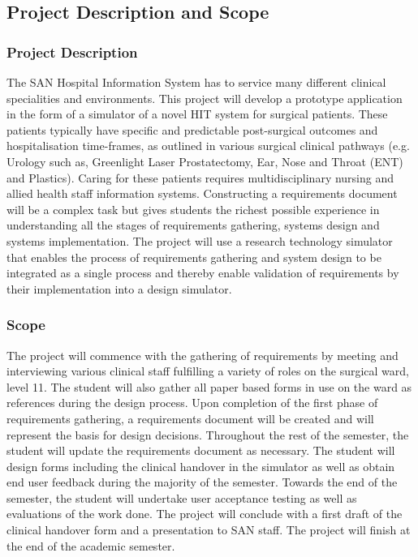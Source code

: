 \subsection{Project Description and Scope}
\subsubsection{Project Description}
The SAN Hospital Information System has to service many different clinical specialities and environments. This project will develop a prototype application in the form of a simulator of a novel HIT system for surgical patients. These patients typically have specific and predictable post-surgical outcomes and hospitalisation time-frames, as outlined in various surgical clinical pathways (e.g. Urology such as, Greenlight Laser Prostatectomy, Ear, Nose and Throat (ENT) and Plastics). Caring for these patients requires multidisciplinary nursing and allied health staff information systems.
Constructing a requirements document will be a complex task but gives students the richest possible experience in understanding all the stages of requirements gathering, systems design and systems implementation. The project will use a research technology simulator that enables the process of requirements gathering and system design to be integrated as a single process and thereby enable validation of requirements by their implementation into a design simulator. 

\subsubsection{Scope}
The project will commence with the gathering of requirements by meeting and interviewing various clinical staff fulfilling a variety of roles on the surgical ward, level 11. The student will also gather all paper based forms in use on the ward as references during the design process. Upon completion of the first phase of requirements gathering, a requirements document will be created and will represent the basis for design decisions. Throughout the rest of the semester, the student will update the requirements document as necessary. The student will design forms including the clinical handover in the simulator as well as obtain end user feedback during the majority of the semester. Towards the end of the semester, the student will undertake user acceptance testing as well as evaluations of the work done. The project will conclude with a first draft of the clinical handover form and a presentation to SAN staff. The project will finish at the end of the academic semester.

